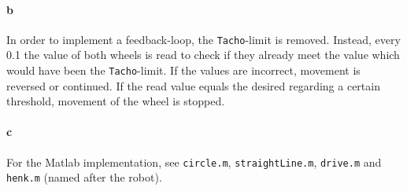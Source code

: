 \documentclass[12pt]{article}
\begin{document}
\paragraph{b} In order to implement a feedback-loop, the \verb|Tacho|-limit is removed. Instead, every 0.1 the value of both wheels is read to check if they already meet the value which would have been the \verb|Tacho|-limit. If the values are incorrect, movement is reversed or continued. If the read value equals the desired regarding a certain threshold, movement of the wheel is stopped.
\paragraph{c} For the Matlab implementation, see \verb|circle.m|, \verb|straightLine.m|, \verb|drive.m| and \verb|henk.m| (named after the robot).
\clearpage
\end{document}
